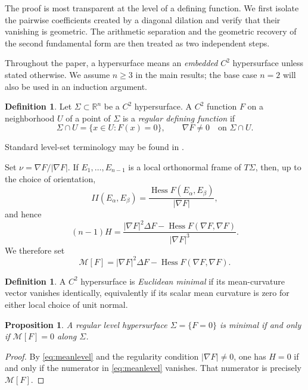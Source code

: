 \documentclass[preprint,12pt]{elsarticle}
\numberwithin{equation}{section}
\newtheorem{proposition}[theorem]{Proposition}
\theoremstyle{definition}\newtheorem{definition}[theorem]{Definition}
\theoremstyle{remark}\newtheorem{remark}[theorem]{Remark}
\begin{document}
The proof is most transparent at the level of a defining function. We first isolate the pairwise coefficients created by a diagonal dilation and verify that their vanishing is geometric. The arithmetic separation and the geometric recovery of the second fundamental form are then treated as two independent steps.

Throughout the paper, a hypersurface means an \emph{embedded} $C^2$ hypersurface unless stated otherwise. We assume $n\ge3$ in the main results; the base case $n=2$ will also be used in an induction argument.

\begin{definition}\label{def:regular}
Let $\Sigma\subset\mathbb R^n$ be a $C^2$ hypersurface. A $C^2$ function $F$ on a neighborhood $U$ of a point of $\Sigma$ is a \emph{regular defining function} if
\begin{equation}\label{eq:defining}
\Sigma\cap U=\{x\in U:F(x)=0\},\qquad \nabla F\ne0\quad\text{on }\Sigma\cap U.
\end{equation}
\end{definition}
Standard level-set terminology may be found in \cite{Lee2018}.

Set $\nu=\nabla F/|\nabla F|$. If $E_1,\ldots,E_{n-1}$ is a local orthonormal frame of $T\Sigma$, then, up to the choice of orientation,
\begin{equation}\label{eq:IIlevel}
II(E_\alpha,E_\beta)=\frac{\operatorname{Hess}F(E_\alpha,E_\beta)}{|\nabla F|},
\end{equation}
and hence
\begin{equation}\label{eq:meanlevel}
(n-1)H=\frac{|\nabla F|^2\Delta F-\operatorname{Hess}F(\nabla F,\nabla F)}{|\nabla F|^3}.
\end{equation}
We therefore set
\begin{equation}\label{eq:minop}
\mathcal M[F]=|\nabla F|^2\Delta F-\operatorname{Hess}F(\nabla F,\nabla F).
\end{equation}

\begin{definition}\label{def:minimal}
A $C^2$ hypersurface is \emph{Euclidean minimal} if its mean-curvature vector vanishes identically, equivalently if its scalar mean curvature is zero for either local choice of unit normal.
\end{definition}

\begin{proposition}\label{prop:minop}
A regular level hypersurface $\Sigma=\{F=0\}$ is minimal if and only if $\mathcal M[F]=0$ along $\Sigma$.
\end{proposition}
\begin{proof}
By \eqref{eq:meanlevel} and the regularity condition $|\nabla F|\ne0$, one has $H=0$ if and only if the numerator in \eqref{eq:meanlevel} vanishes. That numerator is precisely $\mathcal M[F]$.
\end{proof}
\end{document}
